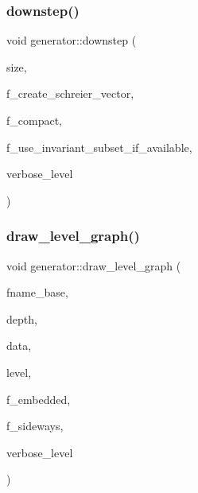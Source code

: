 \mbox{\label{classgenerator_ad90bc284af0b5f5beae960a0bd7a5b43}} 
\subsubsection{\texorpdfstring{downstep()}{downstep()}}
{\footnotesize\ttfamily void generator\+::downstep (\begin{DoxyParamCaption}\item[{\mbox{\hyperlink{galois_8h_a09fddde158a3a20bd2dcadb609de11dc}{I\+NT}}}]{size,  }\item[{\mbox{\hyperlink{galois_8h_a09fddde158a3a20bd2dcadb609de11dc}{I\+NT}}}]{f\+\_\+create\+\_\+schreier\+\_\+vector,  }\item[{\mbox{\hyperlink{galois_8h_a09fddde158a3a20bd2dcadb609de11dc}{I\+NT}}}]{f\+\_\+compact,  }\item[{\mbox{\hyperlink{galois_8h_a09fddde158a3a20bd2dcadb609de11dc}{I\+NT}}}]{f\+\_\+use\+\_\+invariant\+\_\+subset\+\_\+if\+\_\+available,  }\item[{\mbox{\hyperlink{galois_8h_a09fddde158a3a20bd2dcadb609de11dc}{I\+NT}}}]{verbose\+\_\+level }\end{DoxyParamCaption})}

\mbox{\label{classgenerator_a6bbc7b7aafea55ff8e202efc43ab263c}} 
\subsubsection{\texorpdfstring{draw\+\_\+level\+\_\+graph()}{draw\_level\_graph()}}
{\footnotesize\ttfamily void generator\+::draw\+\_\+level\+\_\+graph (\begin{DoxyParamCaption}\item[{const \mbox{\hyperlink{galois_8h_ab6cc7b4aeb6ea31aba2b3fbfc83ff5e6}{B\+Y\+TE}} $\ast$}]{fname\+\_\+base,  }\item[{\mbox{\hyperlink{galois_8h_a09fddde158a3a20bd2dcadb609de11dc}{I\+NT}}}]{depth,  }\item[{\mbox{\hyperlink{galois_8h_a09fddde158a3a20bd2dcadb609de11dc}{I\+NT}}}]{data,  }\item[{\mbox{\hyperlink{galois_8h_a09fddde158a3a20bd2dcadb609de11dc}{I\+NT}}}]{level,  }\item[{\mbox{\hyperlink{galois_8h_a09fddde158a3a20bd2dcadb609de11dc}{I\+NT}}}]{f\+\_\+embedded,  }\item[{\mbox{\hyperlink{galois_8h_a09fddde158a3a20bd2dcadb609de11dc}{I\+NT}}}]{f\+\_\+sideways,  }\item[{\mbox{\hyperlink{galois_8h_a09fddde158a3a20bd2dcadb609de11dc}{I\+NT}}}]{verbose\+\_\+level }\end{DoxyParamCaption})}

